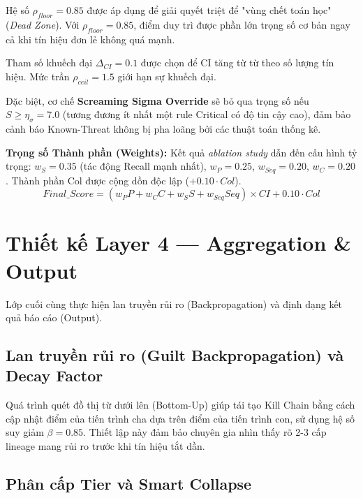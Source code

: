 \documentclass[../main.tex]{subfiles}
\begin{document}
Hệ số \textbf{$\rho_{floor} = 0.85$} được áp dụng để giải quyết triệt để "vùng chết toán học" (\textit{Dead Zone}). Với $\rho_{floor} = 0.85$, điểm duy trì được phần lớn trọng số cơ bản ngay cả khi tín hiệu đơn lẻ không quá mạnh.

Tham số khuếch đại \textbf{$\Delta_{CI} = 0.1$} được chọn để CI tăng từ từ theo số lượng tín hiệu. Mức trần \textbf{$\rho_{ceil} = 1.5$} giới hạn sự khuếch đại.

Đặc biệt, cơ chế \textbf{Screaming Sigma Override} sẽ bỏ qua trọng số nếu $S \ge \eta_\sigma = 7.0$ (tương đương ít nhất một rule Critical có độ tin cậy cao), đảm bảo cảnh báo Known-Threat không bị pha loãng bởi các thuật toán thống kê.

\textbf{Trọng số Thành phần (Weights):} Kết quả \textit{ablation study} dẫn đến cấu hình tỷ trọng: $w_S = 0.35$ (tác động Recall mạnh nhất), $w_P = 0.25$, $w_{Seq} = 0.20$, $w_C = 0.20$. Thành phần Col được cộng dồn độc lập ($+0.10 \cdot Col$).
\begin{equation}
    Final\_Score = (w_P P + w_C C + w_S S + w_{Seq} Seq) \times CI + 0.10 \cdot Col \tag{2.4}
\end{equation}

\section{Thiết kế Layer 4 — Aggregation \& Output}
\label{section:3.8}

Lớp cuối cùng thực hiện lan truyền rủi ro (Backpropagation) và định dạng kết quả báo cáo (Output).

\subsection{Lan truyền rủi ro (Guilt Backpropagation) và Decay Factor}
\label{subsection:3.8.1}

Quá trình quét đồ thị từ dưới lên (Bottom-Up) giúp tái tạo Kill Chain bằng cách cập nhật điểm của tiến trình cha dựa trên điểm của tiến trình con, sử dụng hệ số suy giảm \textbf{$\beta = 0.85$}. Thiết lập này đảm bảo chuyên gia nhìn thấy rõ 2-3 cấp lineage mang rủi ro trước khi tín hiệu tắt dần.

\subsection{Phân cấp Tier và Smart Collapse}
\label{subsection:3.8.2}
\end{document}
